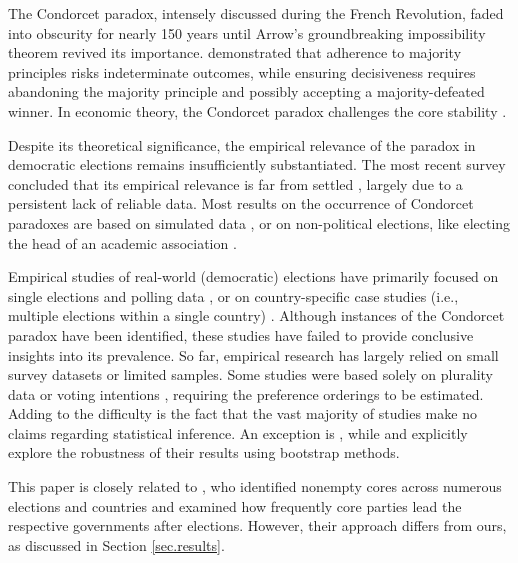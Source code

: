 \documentclass[12pt]{scrartcl}
\begin{document}
The Condorcet paradox, intensely discussed during the French Revolution, faded into obscurity for nearly 150 years \citep[][p.~99]{Rothschild2005, McLean2019} until Arrow’s groundbreaking impossibility theorem revived its importance.  \citet{Arrow1950} demonstrated that adherence to majority principles risks indeterminate outcomes, while ensuring decisiveness requires abandoning the majority principle and possibly accepting a majority-defeated winner. In economic theory, the Condorcet paradox challenges the core stability \citep{Moulin2014}.

Despite its theoretical significance, the empirical relevance of the paradox in democratic elections remains insufficiently substantiated. The most recent survey concluded that its empirical relevance is far from settled \citep{VanDeemen2013}, largely due to a persistent lack of reliable data. Most results on the occurrence of Condorcet paradoxes are based on simulated data \citep{Lepelley2001, Gehrlein2006, Sauermann2022}, or on non-political elections, like electing the head of an academic association \citep{Chamberlin1984, Feld1992, Regenwetter2007, Tideman2009, Popov2014}.

Empirical studies of real-world (democratic) elections have primarily focused on single elections and polling data \citep{Kurrild2018, Darmann2019, Potthoff2021}, or on country-specific case studies (i.e., multiple elections within a single country) \citep{Abramson1995, vanDeemen1998, KurrildKlitgaard2001, KurrildKlitgaard2008}. Although instances of the Condorcet paradox have been identified, these studies have failed to provide conclusive insights into its prevalence. So far, empirical research has largely relied on small survey datasets or limited samples. Some studies were based solely on plurality data \citep[e.g.,][]{Riker1988} or voting intentions \citep[e.g.,][]{McDonald2012}, requiring the preference orderings to be estimated. Adding to the difficulty is the fact that the vast majority of studies make no claims regarding statistical inference. An exception is \cite{Desai2025}, while \cite{Regenwetter2007} and \cite{Darmann2019} explicitly explore the robustness of their results using bootstrap methods.

This paper is closely related to \cite{Desai2025}, who identified nonempty cores across numerous elections and countries and examined how frequently core parties lead the respective governments after elections. However, their approach differs from ours, as discussed in Section \ref{sec.results}.
\end{document}
